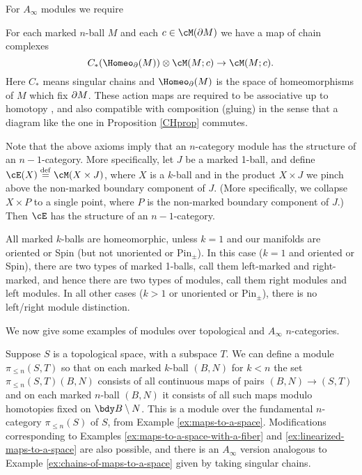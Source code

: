 For $A_\infty$ modules we require

\addtocounter{module-axiom}{-1}
\begin{module-axiom}
{For each marked $n$-ball $M$ and each $c\in \cM(\bd M)$ we have a map of chain complexes
\[
	C_*(\Homeo_\bd(M))\ot \cM(M; c) \to \cM(M; c) .
\]
Here $C_*$ means singular chains and $\Homeo_\bd(M)$ is the space of homeomorphisms of $M$
which fix $\partial M$.
These action maps are required to be associative up to homotopy
, and also compatible with composition (gluing) in the sense that
a diagram like the one in Proposition \ref{CHprop} commutes.
}
\end{module-axiom}

\medskip

Note that the above axioms imply that an $n$-category module has the structure
of an $n{-}1$-category.
More specifically, let $J$ be a marked 1-ball, and define $\cE(X)\deq \cM(X\times J)$,
where $X$ is a $k$-ball and in the product $X\times J$ we pinch 
above the non-marked boundary component of $J$.
(More specifically, we collapse $X\times P$ to a single point, where
$P$ is the non-marked boundary component of $J$.)
Then $\cE$ has the structure of an $n{-}1$-category.

All marked $k$-balls are homeomorphic, unless $k = 1$ and our manifolds
are oriented or Spin (but not unoriented or $\text{Pin}_\pm$).
In this case ($k=1$ and oriented or Spin), there are two types
of marked 1-balls, call them left-marked and right-marked,
and hence there are two types of modules, call them right modules and left modules.
In all other cases ($k>1$ or unoriented or $\text{Pin}_\pm$),
there is no left/right module distinction.

\medskip

We now give some examples of modules over topological and $A_\infty$ $n$-categories.

\begin{example}
\todo{}
\end{example}

\begin{example}
Suppose $S$ is a topological space, with a subspace $T$.
We can define a module $\pi_{\leq n}(S,T)$ so that on each marked $k$-ball $(B,N)$ 
for $k<n$ the set $\pi_{\leq n}(S,T)(B,N)$ consists of all continuous maps of pairs 
$(B,N) \to (S,T)$ and on each marked $n$-ball $(B,N)$ it consists of all 
such maps modulo homotopies fixed on $\bdy B \setminus N$.
This is a module over the fundamental $n$-category $\pi_{\leq n}(S)$ of $S$, from Example \ref{ex:maps-to-a-space}.
Modifications corresponding to Examples \ref{ex:maps-to-a-space-with-a-fiber} and 
\ref{ex:linearized-maps-to-a-space} are also possible, and there is an $A_\infty$ version analogous to 
Example \ref{ex:chains-of-maps-to-a-space} given by taking singular chains.
\end{example}


